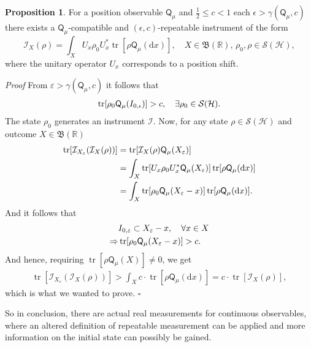 \documentclass[a4paper,12pt]{wihuri}
\theoremstyle{definition}
\newtheorem{proposition}{Proposition}
\numberwithin{definition}{section}
\numberwithin{example}{section}
\numberwithin{theorem}{section}
\numberwithin{proposition}{section}
\numberwithin{lemma}{section}
\newcommand{\I}{\mathcal{I}}%
\newcommand{\hi}{\mathcal{H}}%
\newcommand{\tila}{\mathcal{S}}%
\newcommand{\borel}{\mathfrak{B}}
\newcommand{\Q}{\mathsf{Q}}%
\newcommand{\real}{\mathbb{R}}%
\DeclareMathOperator{\tr}{tr}
\begin{document}
\begin{proposition}
For a position observable $\Q_\mu$ and $\frac{1}{2} \leq c < 1$ each $\epsilon > \gamma(\Q_\mu, c)$ there exists a $\Q_\mu$-compatible and $(\epsilon, c)$-repeatable instrument of the form
\begin{equation}
\I_X(\rho) = \int_X U_x \rho_0 U_x^*\tr[\rho\Q_\mu(\text{d}x)], \quad X\in\borel(\real),\, \rho_0,\rho \in \tila(\hi),
\end{equation}
where the unitary operator $U_x$ corresponds to a position shift.

\noindent \textit{Proof} From $\varepsilon > \gamma(\Q_\mu, c)$ it follows that
\begin{align*}
\tr[\rho_0\Q_\mu(I_{0,\epsilon})] > c, \quad \exists \rho_0 \in \tila(\hi)\text.
\end{align*}
The state $\rho_0$ generates an instrument $\I$. Now, for any state $\rho \in \tila(\hi)$ and outcome $X \in \borel(\real)$
\begin{align*}
\tr[\I_{X_\varepsilon}(\I_X(\rho))] &= \tr[\I_X(\rho)\Q_\mu(X_\varepsilon)] \\
&=\int_X\tr[U_x\rho_0U_x^*\Q_\mu(X_\varepsilon)]\tr[\rho\Q_\mu(\text{d}x)] \\
&=\int_X\tr[\rho_0\Q_\mu(X_\varepsilon - x)]\tr[\rho\Q_\mu(\text{d}x)]\text.
\end{align*}
And it follows that
\begin{align*}
&I_{0,\varepsilon} \subset X_\varepsilon - x, \quad \forall x \in X\\
\Rightarrow &\tr[\rho_0\Q_\mu(X_\varepsilon -x)] > c\text.
\end{align*}
And hence, requiring $\tr[\rho\Q_\mu(X)] \neq 0$, we get
\begin{align*}
\tr[\I_{X_\varepsilon}(\I_X(\rho))] > \int_X c\cdot\tr[\rho\Q_\mu(\text{d}x)] = c\cdot \tr[\I_X(\rho)],
\end{align*}
which is what we wanted to prove. \hfill $\square$
\end{proposition}
So in conclusion, there are actual real measurements for continuous observables, where an altered definition of repeatable measurement can be applied and more information on the initial state can possibly be gained.














\newpage



\renewcommand{\baselinestretch}{1}\large\normalsize
{}




\label{marker}

\newpage
\setcounter{page}{1}
\setcounter{section}{0}
\renewcommand\thesection{\Alph{section}}
\renewcommand\thepage{\Alph{section}--\arabic{page}}
\end{document}
